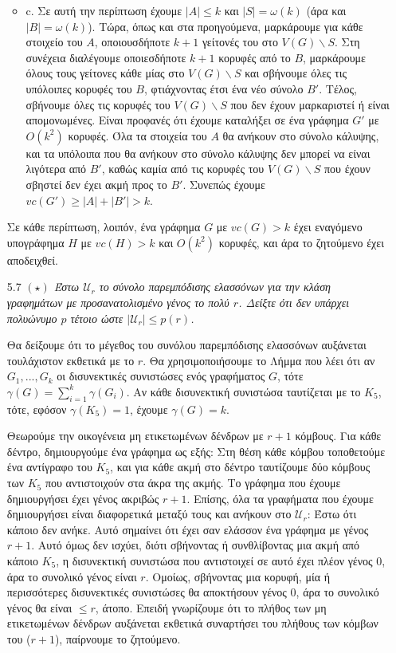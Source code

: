 \documentclass[a4paper, oneside, 11pt]{article}
\theoremstyle{definition}
\begin{document}
\begin{enumerate}
\begin{itemize}
\item{c.}
Σε αυτή την περίπτωση έχουμε $|A|\leq k$ και $|S|=\omega(k)$ (άρα και $|B|=\omega(k)$). Τώρα, όπως και στα προηγούμενα, μαρκάρουμε για κάθε στοιχείο του $A$, οποιουσδήποτε $k+1$ γείτονές του στο
$V(G)\backslash S$. Στη συνέχεια διαλέγουμε οποιεσδήποτε $k+1$ κορυφές από το $B$, μαρκάρουμε όλους τους γείτονες κάθε μίας στο $V(G)\backslash S$ και σβήνουμε όλες τις υπόλοιπες κορυφές του $B$,
φτιάχνοντας έτσι ένα νέο σύνολο $B'$.
Τέλος, σβήνουμε όλες τις κορυφές του $V(G)\backslash S$ που δεν έχουν μαρκαριστεί ή είναι απομονωμένες. Είναι προφανές ότι έχουμε καταλήξει σε ένα γράφημα $G'$
με $O(k^2)$ κορυφές. Όλα τα στοιχεία του $A$ θα ανήκουν
στο σύνολο κάλυψης, και τα υπόλοιπα που θα ανήκουν στο σύνολο κάλυψης δεν μπορεί να είναι λιγότερα από $B'$, καθώς καμία από τις κορυφές του $V(G)\backslash S$ που έχουν σβηστεί δεν έχει ακμή
προς το $B'$. Συνεπώς έχουμε $vc(G')\geq |A| + |B'| > k$.

\end{itemize}
Σε κάθε περίπτωση, λοιπόν, ένα γράφημα $G$ με $vc(G)>k$ έχει εναγόμενο υπογράφημα $H$ με $vc(H)>k$ και $O(k^2)$ κορυφές, και άρα το ζητούμενο έχει αποδειχθεί.


	\item[5.7] \emph{$(\star)$ Έστω $\mathcal{U}_r$ το σύνολο παρεμπόδισης ελασσόνων για την κλάση γραφημάτων με προσανατολισμένο γένος το πολύ $r$. Δείξτε ότι δεν υπάρχει πολυώνυμο $p$ τέτοιο ώστε
$|\mathcal{U}_r|\leq p(r)$.}

Θα δείξουμε ότι το μέγεθος του συνόλου παρεμπόδισης ελασσόνων αυξάνεται τουλάχιστον εκθετικά με το $r$. Θα χρησιμοποιήσουμε το Λήμμα που λέει ότι αν $G_1, ..., G_k$ οι δισυνεκτικές συνιστώσες
ενός γραφήματος $G$, τότε $\gamma (G) = \sum_{i=1}^k \gamma(G_i)$. Αν κάθε δισυνεκτική συνιστώσα ταυτίζεται με το $K_5$, τότε, εφόσον $\gamma (K_5)=1$, έχουμε $\gamma (G) = k$.

Θεωρούμε την οικογένεια μη ετικετωμένων δένδρων με $r+1$ κόμβους. Για κάθε δέντρο, δημιουργούμε ένα γράφημα ως εξής: 
Στη θέση κάθε κόμβου τοποθετούμε ένα αντίγραφο του $K_5$, και για κάθε ακμή στο δέντρο ταυτίζουμε δύο κόμβους των $K_5$ που αντιστοιχούν
στα άκρα της ακμής. Το γράφημα που έχουμε δημιουργήσει έχει γένος ακριβώς $r+1$. Επίσης, όλα τα γραφήματα που έχουμε δημιουργήσει είναι διαφορετικά μεταξύ τους και ανήκουν στο $\mathcal{U}_r$:
Έστω ότι κάποιο δεν ανήκε. Αυτό σημαίνει ότι έχει σαν ελάσσον ένα γράφημα με γένος $r+1$. Αυτό όμως δεν ισχύει, διότι σβήνοντας ή συνθλίβοντας μια ακμή από κάποιο 
$K_5$, η δισυνεκτική συνιστώσα που αντιστοιχεί
σε αυτό έχει πλέον γένος $0$, άρα το συνολικό γένος είναι $r$. Ομοίως, σβήνοντας μια κορυφή, μία ή περισσότερες δισυνεκτικές συνιστώσες θα αποκτήσουν γένος $0$, άρα το συνολικό γένος θα είναι $\leq r$,
άτοπο. 
\newline
Επειδή γνωρίζουμε ότι το πλήθος των μη ετικετωμένων δένδρων αυξάνεται εκθετικά συναρτήσει του πλήθους των κόμβων του ($r+1$), παίρνουμε το ζητούμενο.

\end{enumerate}
\end{document}
